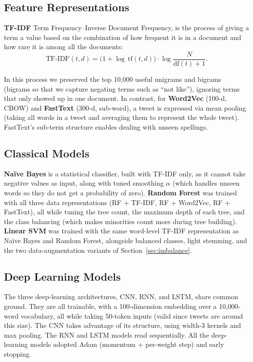 \documentclass[conference]{IEEEtran}
\begin{document}
\subsection{Feature Representations}
\textbf{TF-IDF} 
Term Frequency--Inverse Document Frequency, is the process of giving a term
a value based on the combination of how frequent it is in a document and how rare it is
among all the documents:
\begin{equation}
  \mathrm{TF\text{-}IDF}(t,d)
    = \bigl(1 + \log\,\mathrm{tf}(t,d)\bigr)\cdot
      \log\!\frac{N}{\mathrm{df}(t)+1}.
  \label{eq:tfidf}
\end{equation}

In this process we preserved the top 10,000 useful unigrams and bigrams (bigrams so that we
capture negating terms such as ``not like''), ignoring terms that only showed up in one document.
In contrast, for \textbf{Word2Vec} (100-d, CBOW) and \textbf{FastText} (300-d, sub-word),
a tweet is expressed via mean pooling (taking all words in a tweet and averaging them to represent
the whole tweet). FastText's sub-term structure enables dealing with unseen spellings.


\subsection{Classical Models}
\textbf{Na\"{i}ve Bayes} is a statistical classifier, built with TF-IDF only, as it
cannot take negative values as input, along with tuned smoothing $\alpha$ (which handles unseen
words so they do not get a probability of zero). \textbf{Random Forest} was trained
with all three data representations (RF + TF-IDF, RF + Word2Vec, RF + FastText), all
while tuning the tree count, the maximum depth of each tree, and the class balancing (which makes minorities
count more during tree building). \textbf{Linear SVM} was trained with
the same word-level TF-IDF representation as Na\"{i}ve Bayes and Random Forest, alongside
balanced classes, light stemming, and the two data-augmentation variants
of Section~\ref{sec:imbalance}.


\subsection{Deep Learning Models}
The three deep-learning architectures, CNN, RNN, and LSTM, share common ground. They are
all trainable, with a 100-dimension embedding over a 10,000-word vocabulary, all while
taking 50-token inputs (valid since tweets are around this size). The CNN takes advantage
of its structure, using width-3 kernels and max pooling. The RNN and LSTM models read sequentially. All the
deep-learning models adopted Adam (momentum + per-weight step) and early stopping. 
\end{document}
